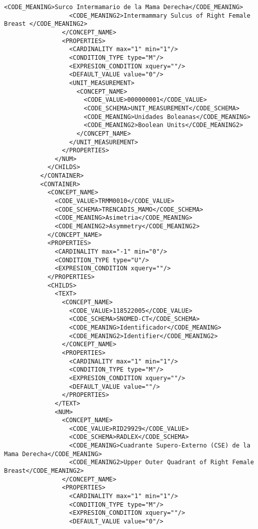 \begin{lstlisting}[label=some-code,caption=Some Code]
                  <CODE_MEANING>Surco Intermamario de la Mama Derecha</CODE_MEANING>
                  <CODE_MEANING2>Intermammary Sulcus of Right Female Breast </CODE_MEANING2>
                </CONCEPT_NAME>
                <PROPERTIES>
                  <CARDINALITY max="1" min="1"/>
                  <CONDITION_TYPE type="M"/>
                  <EXPRESION_CONDITION xquery=""/>
                  <DEFAULT_VALUE value="0"/>
                  <UNIT_MEASUREMENT>
                    <CONCEPT_NAME>
                      <CODE_VALUE>000000001</CODE_VALUE>
                      <CODE_SCHEMA>UNIT_MEASUREMENT</CODE_SCHEMA>
                      <CODE_MEANING>Unidades Boleanas</CODE_MEANING>
                      <CODE_MEANING2>Boolean Units</CODE_MEANING2>
                    </CONCEPT_NAME>
                  </UNIT_MEASUREMENT>
                </PROPERTIES>
              </NUM>
            </CHILDS>
          </CONTAINER>
          <CONTAINER>
            <CONCEPT_NAME>
              <CODE_VALUE>TRMM0010</CODE_VALUE>
              <CODE_SCHEMA>TRENCADIS_MAMO</CODE_SCHEMA>
              <CODE_MEANING>Asimetria</CODE_MEANING>
              <CODE_MEANING2>Asymmetry</CODE_MEANING2>
            </CONCEPT_NAME>
            <PROPERTIES>
              <CARDINALITY max="-1" min="0"/>
              <CONDITION_TYPE type="U"/>
              <EXPRESION_CONDITION xquery=""/>
            </PROPERTIES>
            <CHILDS>
              <TEXT>
                <CONCEPT_NAME>
                  <CODE_VALUE>118522005</CODE_VALUE>
                  <CODE_SCHEMA>SNOMED-CT</CODE_SCHEMA>
                  <CODE_MEANING>Identificador</CODE_MEANING>
                  <CODE_MEANING2>Identifier</CODE_MEANING2>
                </CONCEPT_NAME>
                <PROPERTIES>
                  <CARDINALITY max="1" min="1"/>
                  <CONDITION_TYPE type="M"/>
                  <EXPRESION_CONDITION xquery=""/>
                  <DEFAULT_VALUE value=""/>
                </PROPERTIES>
              </TEXT>
              <NUM>
                <CONCEPT_NAME>
                  <CODE_VALUE>RID29929</CODE_VALUE>
                  <CODE_SCHEMA>RADLEX</CODE_SCHEMA>
                  <CODE_MEANING>Cuadrante Supero-Externo (CSE) de la Mama Derecha</CODE_MEANING>
                  <CODE_MEANING2>Upper Outer Quadrant of Right Female Breast</CODE_MEANING2>
                </CONCEPT_NAME>
                <PROPERTIES>
                  <CARDINALITY max="1" min="1"/>
                  <CONDITION_TYPE type="M"/>
                  <EXPRESION_CONDITION xquery=""/>
                  <DEFAULT_VALUE value="0"/>

\end{lstlisting}
